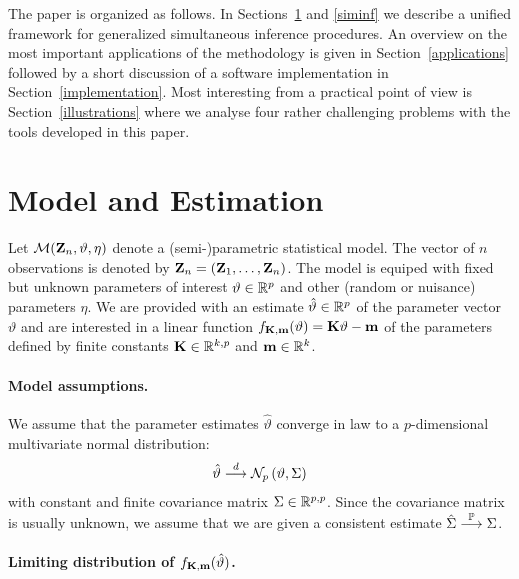 \documentclass[12pt]{article}
\begin{document}
The paper is organized as follows. In Sections~\ref{model} and \ref{siminf} we
describe a unified framework for generalized simultaneous inference
procedures. An overview on the most important applications
of the methodology is given in Section~\ref{applications} followed
by a short discussion of a software implementation in Section~\ref{implementation}.
Most interesting from a practical point of view is 
Section~\ref{illustrations} where we analyse four rather challenging
problems with the tools developed in this paper.

\section{Model and Estimation} \label{model}

Let $\mathcal{M}(\mathbf{Z}_n, \vartheta, \eta)$ denote a (semi-)parametric statistical model.
The vector of $n$ observations is denoted by $\mathbf{Z}_n = (\mathbf{Z}_1, \dots, \mathbf{Z}_n)$. 
The model is equiped with fixed
but unknown parameters of interest $\vartheta \in \mathbb{R}^p$ 
and other (random or nuisance) parameters $\eta$. We are provided 
with an estimate $\hat{\vartheta} \in \mathbb{R}^p$ of the parameter 
vector $\vartheta$ and are interested in a linear
function $f_{\mathbf{K}, \mathbf{m}}(\vartheta) = \mathbf{K} \vartheta - \mathbf{m}$
of the parameters defined by finite constants $\mathbf{K} \in \mathbb{R}^{k, p}$
and $\mathbf{m} \in \mathbb{R}^k$.

\paragraph{Model assumptions.}

We assume that the parameter estimates $\hat{\vartheta}$ converge in law
to a $p$-dimensional multivariate normal distribution:
\begin{eqnarray} \label{normality}
\hat{\vartheta} \stackrel{d}{\longrightarrow} \mathcal{N}_p\left(\vartheta, \Sigma\right)
\end{eqnarray}
with constant and finite covariance matrix $\Sigma \in \mathbb{R}^{p,p}$.
Since the covariance matrix is usually unknown, we assume 
that we are given a consistent estimate $\hat{\Sigma} \stackrel{\mathbb{P}}{\longrightarrow} \Sigma$.

\paragraph{Limiting distribution of $f_{\mathbf{K},\mathbf{m}}(\hat{\vartheta})$.}
\end{document}
